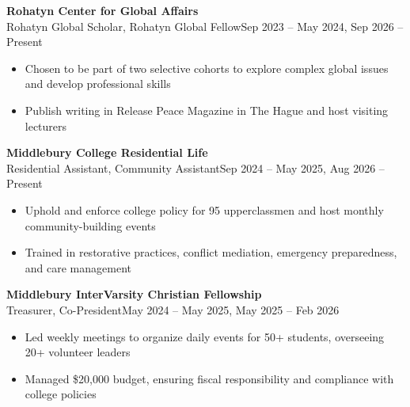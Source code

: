 \documentclass[12pt, a4paper]{article}
\begin{document}
\textbf{Rohatyn Center for Global Affairs}\\
Rohatyn Global Scholar, Rohatyn Global Fellow\hfill{Sep 2023 -- May 2024, Sep 2026 -- Present}\\
\begin{itemize}
    \vspace{-8mm}
    \item Chosen to be part of two selective cohorts to explore complex global issues and develop professional skills
    \item Publish writing in Release Peace Magazine in The Hague and host visiting lecturers
\end{itemize}

\textbf{Middlebury College Residential Life}\\
Residential Assistant, Community Assistant\hfill{Sep 2024 -- May 2025, Aug 2026 -- Present}\\
\begin{itemize}
    \vspace{-8mm}
    \item Uphold and enforce college policy for 95 upperclassmen and host monthly community-building events
    \item Trained in restorative practices, conflict mediation, emergency preparedness, and care management
\end{itemize}

\textbf{Middlebury InterVarsity Christian Fellowship}\\
Treasurer, Co-President\hfill{May 2024 -- May 2025, May 2025 -- Feb 2026}\\
\begin{itemize}
    \vspace{-8mm}
    \item Led weekly meetings to organize daily events for 50+ students, overseeing 20+ volunteer leaders
    \item Managed \$20,000 budget, ensuring fiscal responsibility and compliance with college policies
\end{itemize}

\end{document}
